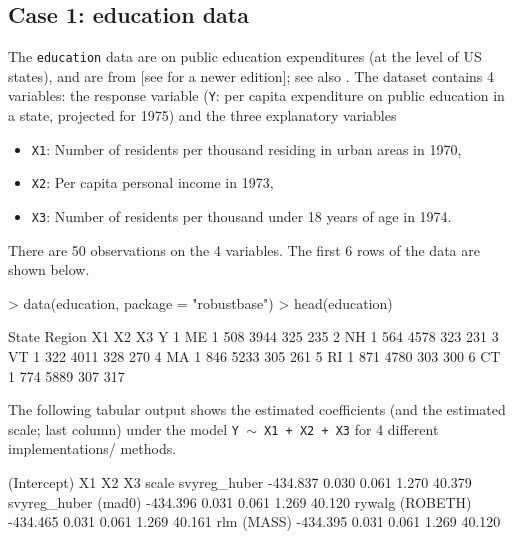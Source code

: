 \documentclass[a4paper,oneside,11pt,DIV=12]{scrartcl}
\newcommand{\code}[1]{{\texttt{#1}}}
\begin{document}
\subsection{Case 1: education data}\label{sec:education}
The \code{education} data are on public education expenditures (at the
level of US states), and are from \cite{chatterjeeprice}
[see \cite{chatterjeehadi} for a newer edition]; see also
\cite{rousseeuwleroy}. The dataset contains 4 variables: the
response variable (\code{Y}: per capita expenditure on public
education in a state, projected for 1975) and the three explanatory
variables
\begin{itemize}
    \item \code{X1}: Number of residents per thousand residing in urban
        areas in 1970,
    \item \code{X2}: Per capita personal income in 1973,
    \item \code{X3}: Number of residents per thousand under 18 years of
        age in 1974.
\end{itemize}

\noindent There are 50 observations on the 4 variables. The first 6
    rows of the data are shown below.
\begin{Schunk}
\begin{Sinput}
> data(education, package = "robustbase")
> head(education)
\end{Sinput}
\begin{Soutput}
  State Region  X1   X2  X3   Y
1    ME      1 508 3944 325 235
2    NH      1 564 4578 323 231
3    VT      1 322 4011 328 270
4    MA      1 846 5233 305 261
5    RI      1 871 4780 303 300
6    CT      1 774 5889 307 317
\end{Soutput}
\end{Schunk}

\noindent The following tabular output shows the estimated coefficients
(and the estimated scale; last column) under the model
\code{Y $\sim$ X1 + X2 + X3} for 4 different implementations/ methods.
\begin{Schunk}
\begin{Soutput}
                    (Intercept)    X1    X2    X3  scale
svyreg_huber           -434.837 0.030 0.061 1.270 40.379
svyreg_huber (mad0)    -434.396 0.031 0.061 1.269 40.120
rywalg (ROBETH)        -434.465 0.031 0.061 1.269 40.161
rlm (MASS)             -434.395 0.031 0.061 1.269 40.120
\end{Soutput}
\end{Schunk}
\end{document}
